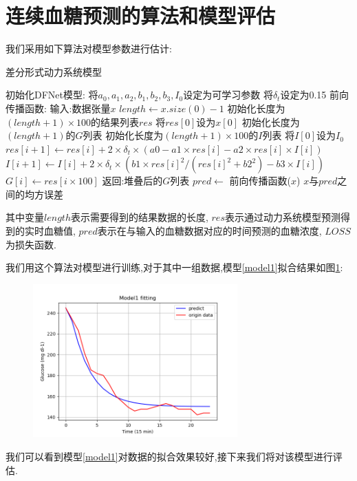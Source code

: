     
\section{连续血糖预测的算法和模型评估} 
我们采用如下算法对模型参数进行估计:
\begin{algorithm}[H]
    \caption{差分形式动力系统模型}
    \begin{algorithmic}[1]
    \State 初始化DFNet模型:
    \State \quad 将$a_0, a_1, a_2, b_1, b_2, b_3, I_0$设定为可学习参数
    \State \quad 将$\delta_t$设定为0.15
    \State 前向传播函数:
    \State \quad 输入:数据张量$x$
    \State \quad $length \gets x.size(0) - 1$
    \State \quad 初始化长度为$(length + 1) \times 100$的结果列表$res$
    \State \quad 将$res[0]$设为$x[0]$
    \State \quad 初始化长度为$(length + 1)$的$G$列表
    \State \quad 初始化长度为$(length + 1) \times 100$的$I$列表
    \State \quad 将$I[0]$设为$I_0$
        \State $res[i + 1] \gets res[i] + 2 \times \delta_t \times (a0 - a1 \times res[i] - a2 \times res[i] \times I[i])$
        \State $I[i + 1] \gets I[i] + 2 \times \delta_t \times (b1 \times res[i]^2 / (res[i]^2 + b2^2) - b3 \times I[i])$
    \EndFor
        \State $G[i] \gets res[i \times 100]$
    \EndFor
    \State 返回:堆叠后的$G$列表
    \State
        \State $pred \gets$ 前向传播函数($x$)
        \State \Return $x$与$pred$之间的均方误差
    \EndFunction
    \end{algorithmic}
    \end{algorithm}

    其中变量$length$表示需要得到的结果数据的长度, $res$表示通过动力系统模型预测得到的实时血糖值, $pred$表示在与输入的血糖数据对应的时间预测的血糖浓度, $LOSS$为损失函数. 

    我们用这个算法对模型进行训练,对于其中一组数据,模型\ref{model1}拟合结果如图\ref{fig:fit_1}:

    \begin{figure}[H]
        \centering
        \includegraphics[width=0.7\textwidth]{Img/fit_1.png}
        \label{fig:fit_1}
    \end{figure}
    我们可以看到模型\ref{model1}对数据的拟合效果较好,接下来我们将对该模型进行评估. 

